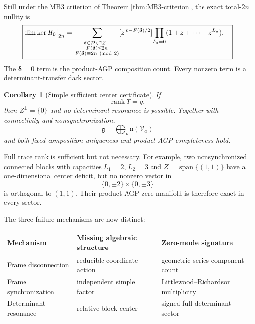 \documentclass[11pt]{article}
\numberwithin{equation}{section}
\newtheorem{corollary}[theorem]{Corollary}
\newcommand{\Span}{\operatorname{span}}
\newcommand{\cV}{\mathcal V}
\newcommand{\fg}{\mathfrak g}
\newcommand{\rank}{\operatorname{rank}}
\begin{document}
Still under the MB3 criterion of Theorem \ref{thm:MB3-criterion}, the exact total-$2n$ nullity is
\begin{equation}
 \boxed{
 \begin{aligned}
 \dim\ker H_0\big|_{2n}
 ={}&
 \sum_{\substack{
 \boldsymbol\delta\in\mathcal D_L\cap Z^\perp\\
 F(\boldsymbol\delta)\le2n\\
 F(\boldsymbol\delta)\equiv2n\ ({\rm mod}\ 2)
 }}
 [z^{\,n-F(\boldsymbol\delta)/2}]
 \prod_{\delta_a=0}
 (1+z+\cdots+z^{L_a}).
 \end{aligned}}
 \label{eq:total-nullity-count}
\end{equation}
The $\boldsymbol\delta=0$ term is the product-AGP composition count.  Every nonzero term is a determinant-transfer dark sector.

\begin{corollary}[Simple sufficient center certificate]
\label{cor:full-trace-rank}
If
\begin{equation}
 \rank T=q,
 \label{eq:full-trace-rank}
\end{equation}
then $Z^\perp=\{0\}$ and no determinant resonance is possible.  Together with connectivity and nonsynchronization,
\begin{equation}
 \fg=\bigoplus_a\mathfrak u(\cV_a)
 \label{eq:full-joint-u}
\end{equation}
and both fixed-composition uniqueness and product-AGP completeness hold.
\end{corollary}

Full trace rank is sufficient but not necessary.  For example, two nonsynchronized connected blocks with capacities $L_1=2$, $L_2=3$ and $Z=\Span\{(1,1)\}$ have a one-dimensional center deficit, but no nonzero vector in
\begin{equation}
 \{0,\pm2\}\times\{0,\pm3\}
 \label{eq:unequal-capacity-set}
\end{equation}
is orthogonal to $(1,1)$.  Their product-AGP zero manifold is therefore exact in every sector.

The three failure mechanisms are now distinct:
\begin{center}
\begin{tabular}{p{}p{}p{}}
\toprule
Mechanism & Missing algebraic structure & Zero-mode signature\\
\midrule
Frame disconnection & reducible coordinate action & geometric-series component count\\
Frame synchronization & independent simple factor & Littlewood--Richardson multiplicity\\
Determinant resonance & relative block center & signed full-determinant sector\\
\bottomrule
\end{tabular}
\end{center}
\end{document}
